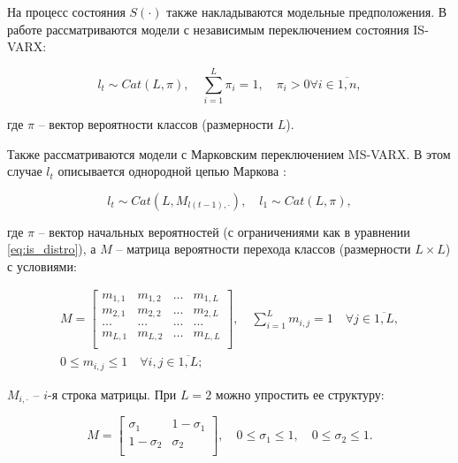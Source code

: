 \documentclass[a4paper,14pt]{extreport}
\begin{document}
На процесс состояния $S(\cdot)$ также накладываются модельные предположения. В работе рассматриваются модели с независимым переключением состояния IS-VARX:

\begin{equation}
	l_t \sim \mathit{Cat}(L, \pi), \quad \sum_{i=1}^{L}{\pi_i} = 1, \quad \pi_i > 0  \forall i \in \overline{1,n},
	\label{eq:is_distro}
\end{equation}

\noindent
где $\pi$ -- вектор вероятности классов (размерности $L$).

Также рассматриваются модели с Марковским переключением MS-VARX. 
В этом случае $l_t$ описывается однородной цепью Маркова  \cite{malNovopMSVARX}:

\begin{equation}
	l_t \sim \mathit{Cat}(L, M_{l(t-1), \cdot}),
	\quad 
	l_1 \sim \mathit{Cat}(L, \pi) ,
\end{equation}

\noindent
где $\pi$ -- вектор начальных вероятностей (с ограничениями как в уравнении \eqref{eq:is_distro}), а $M$ -- матрица вероятности перехода классов (размерности $L \times L$) с условиями:

\begin{equation}
	\begin{multlined}
		M=
		\left[
			{
					\begin{array}{cccc}
						m_{1,1} & m_{1,2} & ... & m_{1,L} \\
						m_{2,1} & m_{2,2} & ... & m_{2,L} \\
						...     & ...     & ... & ...     \\
						m_{L,1} & m_{L,2} & ... & m_{L,L} \\
					\end{array}
				}
			\right]
		, \quad
		\sum_{i=1}^{L} m_{i,j} = 1 \quad \forall j \in \overline{1,L}
		,
		\\
		0 \le m_{i,j} \le 1 \quad \forall i, j \in \overline{1,L} ;
	\end{multlined}
\end{equation}

\noindent
$M_{i, \cdot}$ -- $i$-я строка матрицы. При $L=2$ можно упростить ее структуру:

\begin{equation}
	M=
	\left[ {
				\begin{array}{cc}
					\sigma_{1}   & 1-\sigma_{1} \\
					1-\sigma_{2} & \sigma_{2}   \\
				\end{array}
			} \right]
	, \quad 
	0 \le \sigma_{1} \le 1
	, \quad 
	0 \le \sigma_{2} \le 1
	.
\end{equation}
\end{document}
